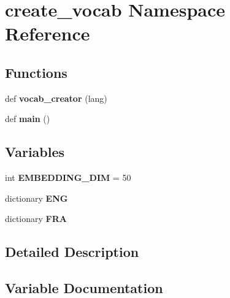 \hypertarget{namespacecreate__vocab}{}\section{create\+\_\+vocab Namespace Reference}
\label{namespacecreate__vocab}
\subsection*{Functions}
\begin{DoxyCompactItemize}
\item 
def {\bfseries vocab\+\_\+creator} (lang)\hypertarget{namespacecreate__vocab_a934fa41a33eb2c42863a710aee601baf}{}\label{namespacecreate__vocab_a934fa41a33eb2c42863a710aee601baf}

\item 
def {\bfseries main} ()\hypertarget{namespacecreate__vocab_a30adee6f6a1634c6a76af87221c86152}{}\label{namespacecreate__vocab_a30adee6f6a1634c6a76af87221c86152}

\end{DoxyCompactItemize}
\subsection*{Variables}
\begin{DoxyCompactItemize}
\item 
int {\bfseries E\+M\+B\+E\+D\+D\+I\+N\+G\+\_\+\+D\+IM} = 50\hypertarget{namespacecreate__vocab_ab0b54e2d83452a91ffa0e8c7c2962056}{}\label{namespacecreate__vocab_ab0b54e2d83452a91ffa0e8c7c2962056}

\item 
dictionary {\bfseries E\+NG}
\item 
dictionary {\bfseries F\+RA}
\end{DoxyCompactItemize}


\subsection{Detailed Description}
\begin{DoxyVerb}\end{DoxyVerb}
 

\subsection{Variable Documentation}
